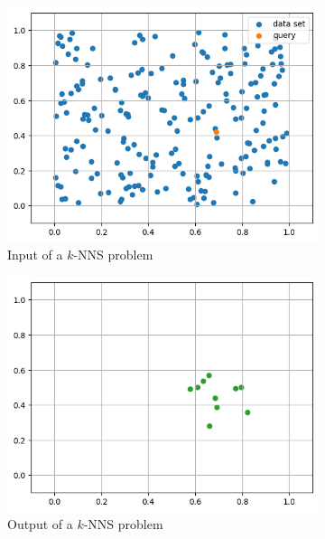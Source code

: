 \begin{figure}[ht]
    \centering
    \hfill
    \begin{subfigure}{0.32\textwidth}
        \includegraphics[width=\textwidth]{images/sim-search-init.png}
        \caption{Input of a \(k\)-NNS problem}
    \end{subfigure}
    \hfill
    \begin{subfigure}{0.32\textwidth}
        \includegraphics[width=\textwidth]{images/sim-search-knn.png}
        \caption*{Output of a \(k\)-NNS problem}
    \end{subfigure}
    \hfill
    \begin{subfigure}{0.32\textwidth}

\end{subfigure}
\end{figure}
